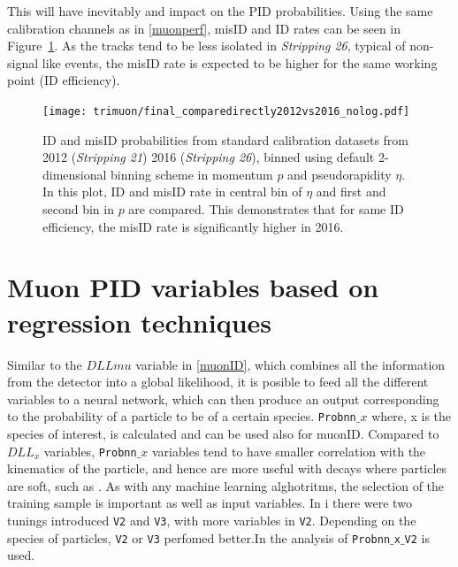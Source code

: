 This will have inevitably and impact on the \gls{PID} probabilities. Using the same calibration channels as in \autoref{muonperf}, misID and ID rates can be seen in Figure~\ref{fig:nSharedRun1andRun2}. As the tracks tend to be less isolated in \textit{Stripping 26}, typical of non-signal like events, the misID rate is expected to be higher for the same working point (ID efficiency).

\begin{figure}[h!]
\centering
\texttt{[image: trimuon/final\_comparedirectly2012vs2016\_nolog.pdf]}
	\caption{ID and misID probabilities from standard calibration datasets from 2012 (\textit{Stripping 21}) 2016 (\textit{Stripping 26}), binned using default 2-dimensional binning scheme in momentum $p$ and pseudorapidity $\eta$. In this plot, ID and misID rate in central bin of $\eta$ and first and second bin in $p$ are compared. This demonstrates that for same ID efficiency, the misID rate is significantly higher in 2016.}
\label{fig:nSharedRun1andRun2}
\end{figure}

\section{Muon PID variables based on regression techniques}
Similar to the $DLLmu$ variable in \autoref{muonID}, which combines all the information from the detector into a global likelihood, it is posible to feed all the different variables to a neural network, which can then produce an output 
corresponding to the probability of a particle to be of a certain species. \texttt{Probnn$\_{x}$} where, x is the species of interest, is calculated and can be used also for muonID. Compared to $DLL_{x}$ variables, \texttt{Probnn$\_{x}$} variables tend to have smaller correlation with the kinematics of the particle, and hence are more useful with decays where particles are soft, such as \Bmumumu. As with any machine learning alghotritms, the selection of the training sample is important as well as input variables. In \Rn{1} there were two tunings introduced \texttt{V2} and \texttt{V3}, with more variables in \texttt{V2}. Depending on the species of particles, \texttt{V2} or \texttt{V3} perfomed better.In the analysis of \Bmumumu \texttt{Probnn$\_${x}$\_$V2} is used.








